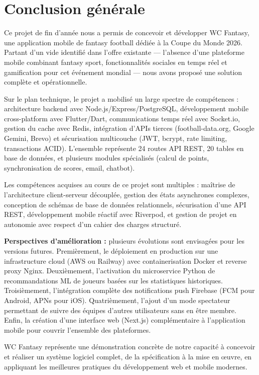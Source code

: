 \vspace*{-3cm}
\chapter*{Conclusion générale}
\vspace*{-1cm}

Ce projet de fin d'année nous a permis de concevoir et développer WC Fantasy, une application mobile de fantasy football dédiée à la Coupe du Monde 2026. Partant d'un vide identifié dans l'offre existante --- l'absence d'une plateforme mobile combinant fantasy sport, fonctionnalités sociales en temps réel et gamification pour cet événement mondial --- nous avons proposé une solution complète et opérationnelle.

Sur le plan technique, le projet a mobilisé un large spectre de compétences : architecture backend avec Node.js/Express/PostgreSQL, développement mobile cross-platform avec Flutter/Dart, communications temps réel avec Socket.io, gestion du cache avec Redis, intégration d'APIs tierces (football-data.org, Google Gemini, Brevo) et sécurisation multicouche (JWT, bcrypt, rate limiting, transactions ACID). L'ensemble représente 24 routes API REST, 20 tables en base de données, et plusieurs modules spécialisés (calcul de points, synchronisation de scores, email, chatbot).

Les compétences acquises au cours de ce projet sont multiples : maîtrise de l'architecture client-serveur découplée, gestion des états asynchrones complexes, conception de schémas de base de données relationnels, sécurisation d'une API REST, développement mobile réactif avec Riverpod, et gestion de projet en autonomie avec respect d'un cahier des charges structuré.



\textbf{Perspectives d'amélioration :} plusieurs évolutions sont envisagées pour les versions futures. Premièrement, le déploiement en production sur une infrastructure cloud (AWS ou Railway) avec containerisation Docker et reverse proxy Nginx. Deuxièmement, l'activation du microservice Python de recommandations ML de joueurs basées sur les statistiques historiques. Troisièmement, l'intégration complète des notifications push Firebase (FCM pour Android, APNs pour iOS). Quatrièmement, l'ajout d'un mode spectateur permettant de suivre des équipes d'autres utilisateurs sans en être membre. Enfin, la création d'une interface web (Next.js) complémentaire à l'application mobile pour couvrir l'ensemble des plateformes.

WC Fantasy représente une démonstration concrète de notre capacité à concevoir et réaliser un système logiciel complet, de la spécification à la mise en \oe{}uvre, en appliquant les meilleures pratiques du développement web et mobile modernes.
